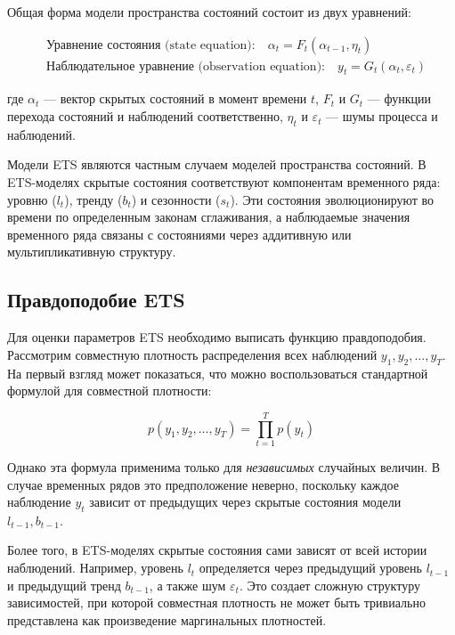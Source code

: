 \documentclass[12pt,fleqn]{article}
\begin{document}
Общая форма модели пространства состояний состоит из двух уравнений:

\begin{equation}
  \begin{split}
    &\text{Уравнение состояния (state equation):} \quad   \alpha_{t} = F_t(\alpha_{t-1}, \eta_t) \\
    &\text{Наблюдательное уравнение (observation equation):} \quad y_t = G_t(\alpha_t, \varepsilon_t)
  \end{split}
\end{equation}

где $\alpha_t$ — вектор скрытых состояний в момент времени $t$, $F_t$ и $G_t$ — функции перехода состояний и наблюдений соответственно, $\eta_t$ и $\varepsilon_t$ — шумы процесса и наблюдений.

Модели ETS являются частным случаем моделей пространства состояний.
В ETS-моделях скрытые состояния соответствуют компонентам временного ряда: уровню ($l_t$), тренду ($b_t$) и сезонности ($s_t$).
Эти состояния эволюционируют во времени по определенным законам сглаживания, а наблюдаемые значения временного ряда связаны с состояниями через аддитивную или мультипликативную структуру.

\subsection{Правдоподобие ETS}

Для оценки параметров ETS необходимо выписать функцию правдоподобия.
Рассмотрим совместную плотность распределения всех наблюдений $y_1, y_2, \ldots, y_T$.
На первый взгляд может показаться, что можно воспользоваться стандартной формулой для совместной плотности:

\begin{equation}
  p(y_1, y_2, \ldots, y_T) = \prod_{t=1}^{T} p(y_t)
\end{equation}

Однако эта формула применима только для \textit{независимых} случайных величин.
В случае временных рядов это предположение неверно, поскольку каждое наблюдение $y_t$ зависит от предыдущих через скрытые состояния модели $l_{t-1}, b_{t-1}$.

Более того, в ETS-моделях скрытые состояния сами зависят от всей истории наблюдений.
Например, уровень $l_t$ определяется через предыдущий уровень $l_{t-1}$ и предыдущий тренд $b_{t-1}$, а также шум $\varepsilon_t$.
Это создает сложную структуру зависимостей, при которой совместная плотность не может быть тривиально представлена как произведение маргинальных плотностей.
\end{document}
